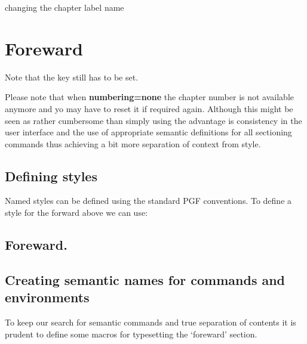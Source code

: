 \begin{decription}
\begin{texexample}{changing the chapter label name}{}
\chapter{Foreward}
\lorem
\end{texexample}

Note that the key  still has to be set.


Please note that when \textbf{numbering=none} the chapter number is not available anymore and yo may have to reset it if required again. Although this might be seen as rather cumbersome than simply using  the advantage is consistency in the user interface and the use of appropriate semantic definitions for all sectioning commands thus achieving a bit more separation of context from style.



\section{Defining styles}

Named styles can be defined using the standard \textsc{PGF} conventions. To define a style for the forward above we can use:

\begin{texexample}{}{}
\chapter{Foreward.}
\lorem
\end{texexample}



\section{Creating semantic names for commands and environments}

To keep our search for semantic commands and true separation of contents it is prudent to define some macros for typesetting the  `foreward' section.


\end{decription}
